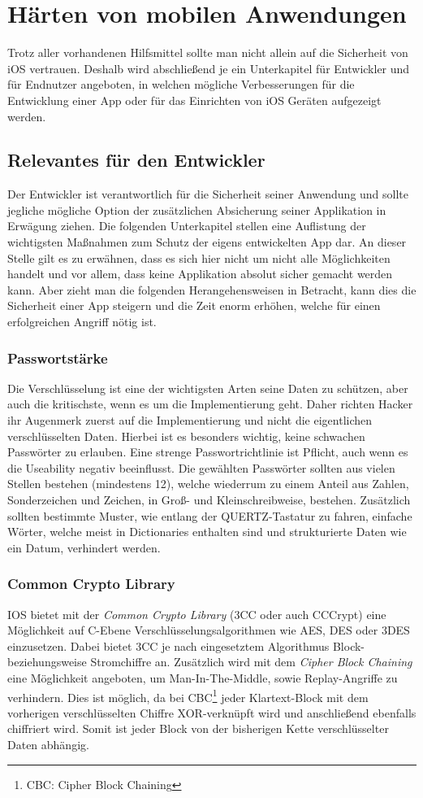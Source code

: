 \section{Härten von mobilen Anwendungen}
	Trotz aller vorhandenen Hilfsmittel sollte man nicht allein auf die Sicherheit
	von iOS vertrauen. Deshalb wird abschließend je ein Unterkapitel
	für Entwickler und für Endnutzer angeboten, in welchen mögliche Verbesserungen
	für die Entwicklung einer App oder für das Einrichten von iOS Geräten aufgezeigt
	werden.
	\subsection{Relevantes für den Entwickler}
		Der Entwickler ist verantwortlich für die Sicherheit seiner Anwendung und
		sollte jegliche mögliche Option der zusätzlichen Absicherung seiner
		Applikation in Erwägung ziehen. Die folgenden Unterkapitel stellen eine
		Auflistung der wichtigsten Maßnahmen zum Schutz der eigens entwickelten App
		dar. An dieser Stelle gilt es zu erwähnen, dass es sich hier nicht um nicht
		alle Möglichkeiten handelt und vor allem, dass keine Applikation absolut
		sicher gemacht werden kann. Aber zieht man die folgenden Herangehensweisen in
		Betracht, kann dies die Sicherheit einer App steigern und die
		Zeit enorm erhöhen, welche für einen erfolgreichen Angriff nötig ist.
		\subsubsection{Passwortstärke}
			Die Verschlüsselung ist eine der wichtigsten Arten seine Daten zu schützen,
			aber auch die kritischste, wenn es um die Implementierung geht. Daher richten
			Hacker ihr Augenmerk zuerst auf die Implementierung und nicht die
			eigentlichen verschlüsselten Daten. Hierbei ist es besonders wichtig, keine
			schwachen Passwörter zu erlauben. Eine strenge Passwortrichtlinie ist
			Pflicht, auch wenn es die Useability negativ beeinflusst. Die gewählten
			Passwörter sollten aus vielen Stellen bestehen (mindestens 12),
			welche wiederrum zu einem Anteil aus Zahlen, Sonderzeichen und Zeichen, in
			Groß- und Kleinschreibweise, bestehen. Zusätzlich sollten bestimmte Muster,
			wie entlang der QUERTZ-Tastatur zu fahren, einfache Wörter, welche meist in
			Dictionaries enthalten sind und strukturierte Daten wie ein Datum, verhindert
			werden.
		\subsubsection{Common Crypto Library}\label{sec:3cc}
			IOS bietet mit der \textsl{Common Crypto Library}\cite{3CC2007}
			(3CC oder auch CCCrypt) eine Möglichkeit auf C-Ebene 
			Verschlüsselungsalgorithmen wie AES, DES oder 3DES einzusetzen. Dabei bietet
			3CC je nach eingesetztem Algorithmus Block- beziehungsweise Stromchiffre an.
			Zusätzlich wird mit dem \textsl{Cipher Block Chaining} eine
			Möglichkeit angeboten, um Man-In-The-Middle, sowie Replay-Angriffe zu
			verhindern. Dies ist möglich, da bei CBC\footnote{CBC: Cipher Block Chaining}
			jeder Klartext-Block mit dem vorherigen verschlüsselten Chiffre
			XOR-verknüpft wird und anschließend ebenfalls chiffriert wird. Somit ist
			jeder Block von der bisherigen Kette verschlüsselter Daten abhängig.
